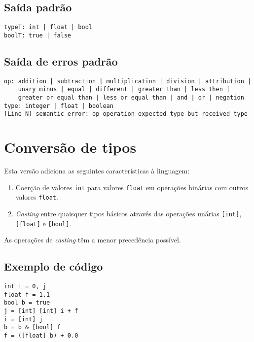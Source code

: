 \documentclass{article}
\newenvironment{smallenum}{
    \vspace{-1mm}
    \begin{enumerate}[label=\roman*.]
    \setlength{\parskip}{0pt}
    \setlength{\itemsep}{2pt}
}{
    \vspace{-2mm}
    \end{enumerate}
}
\begin{document}
\subsection{Saída padrão}

\begin{verbatim}
typeT: int | float | bool
boolT: true | false
\end{verbatim}

\subsection{Saída de erros padrão}

\begin{verbatim}
op: addition | subtraction | multiplication | division | attribution |
    unary minus | equal | different | greater than | less then |
    greater or equal than | less or equal than | and | or | negation
type: integer | float | boolean
[Line N] semantic error: op operation expected type but received type
\end{verbatim}

\section{Conversão de tipos}

Esta versão adiciona as seguintes características à linguagem:

\begin{smallenum}

\item Coerção de valores \texttt{int} para valores \texttt{float} em
    operações binárias com outros valores \texttt{float}.

\item \emph{Casting} entre quaisquer tipos básicos através das operações
    unárias \texttt{[int]}, \texttt{[float]} e \texttt{[bool]}.

\end{smallenum}

As operações de \emph{casting} têm a menor precedência possível.

\subsection{Exemplo de código}

\begin{verbatim}
int i = 0, j
float f = 1.1
bool b = true
j = [int] [int] i + f
i = [int] j
b = b & [bool] f
f = ([float] b) + 0.0
\end{verbatim}
\end{document}
